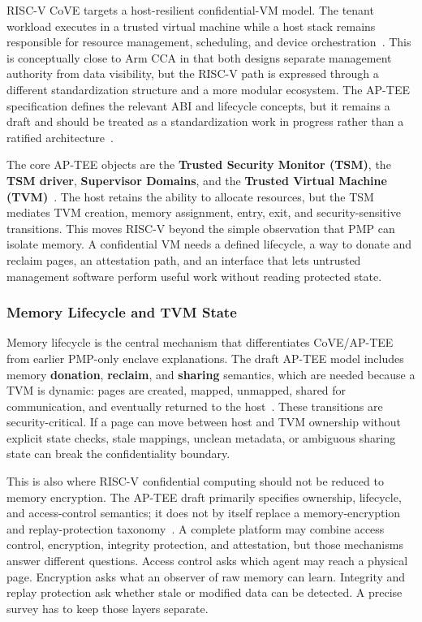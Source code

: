 RISC-V CoVE targets a host-resilient confidential-VM model. The tenant workload
executes in a trusted virtual machine while a host stack remains responsible for
resource management, scheduling, and device orchestration~\cite{sahita2023cove}.
This is conceptually close to Arm CCA in that both designs separate management
authority from data visibility, but the RISC-V path is expressed through a
different standardization structure and a more modular ecosystem. The AP-TEE
specification defines the relevant ABI and lifecycle concepts, but it remains a
draft and should be treated as a standardization work in progress rather than a
ratified architecture~\cite{riscv_ap_tee_2024}.

The core AP-TEE objects are the \textbf{Trusted Security Monitor (TSM)}, the
\textbf{TSM driver}, \textbf{Supervisor Domains}, and the \textbf{Trusted
Virtual Machine (TVM)}~\cite{riscv_ap_tee_2024}. The host retains the ability
to allocate resources, but the TSM mediates TVM creation, memory assignment,
entry, exit, and security-sensitive transitions. This moves RISC-V beyond the
simple observation that PMP can isolate memory. A confidential VM needs a
defined lifecycle, a way to donate and reclaim pages, an attestation path, and
an interface that lets untrusted management software perform useful work without
reading protected state.

\subsubsection{Memory Lifecycle and TVM State}

Memory lifecycle is the central mechanism that differentiates CoVE/AP-TEE from
earlier PMP-only enclave explanations. The draft AP-TEE model includes memory
\textbf{donation}, \textbf{reclaim}, and \textbf{sharing} semantics, which are
needed because a TVM is dynamic: pages are created, mapped, unmapped, shared for
communication, and eventually returned to the host~\cite{riscv_ap_tee_2024}.
These transitions are security-critical. If a page can move between host and TVM
ownership without explicit state checks, stale mappings, unclean metadata, or
ambiguous sharing state can break the confidentiality boundary.

This is also where RISC-V confidential computing should not be reduced to
memory encryption. The AP-TEE draft primarily specifies ownership, lifecycle,
and access-control semantics; it does not by itself replace a memory-encryption
and replay-protection taxonomy~\cite{henson2014memory}. A complete platform may
combine access control, encryption, integrity protection, and attestation, but
those mechanisms answer different questions. Access control asks which agent
may reach a physical page. Encryption asks what an observer of raw memory can
learn. Integrity and replay protection ask whether stale or modified data can be
detected. A precise survey has to keep those layers separate.

